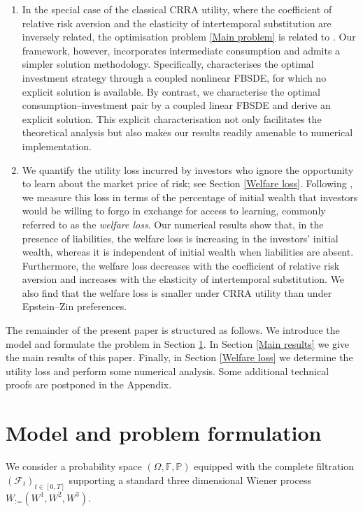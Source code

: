 \documentclass[12,reqno]{amsart}
\numberwithin{equation}{section}
\begin{document}
\begin{enumerate}
	\item In the special case of the classical CRRA utility, where the coefficient of relative risk aversion and the elasticity of intertemporal substitution are inversely related, the optimisation problem \eqref{Main problem} is related to \cite{horst2014forward}. Our framework, however, incorporates intermediate consumption and admits a simpler solution methodology. Specifically, \cite{horst2014forward} characterises the optimal investment strategy through a coupled nonlinear FBSDE, for which no explicit solution is available. By contrast, we characterise the optimal consumption--investment pair by a coupled linear FBSDE and derive an explicit solution. This explicit characterisation not only facilitates the theoretical analysis but also makes our results readily amenable to numerical implementation.
	\item We quantify the utility loss incurred by investors who ignore the opportunity to learn about the market price of risk; see Section \ref{Welfare loss}. Following \cite{escobar2016portfolio}, we measure this loss in terms of the percentage of initial wealth that investors would be willing to forgo in exchange for access to learning, commonly referred to as the \emph{welfare loss}. Our numerical results show that, in the presence of liabilities, the welfare loss is increasing in the investors' initial wealth, whereas it is independent of initial wealth when liabilities are absent. Furthermore, the welfare loss decreases with the coefficient of relative risk aversion and increases with the elasticity of intertemporal substitution. We also find that the welfare loss is smaller under CRRA utility than under Epstein--Zin preferences.
\end{enumerate}

The remainder of the present paper is structured as follows. We introduce the model and formulate the problem in Section \ref{Setting}. In Section \ref{Main results} we give the main results of this paper. Finally, in Section \ref{Welfare loss} we determine the utility loss and perform some numerical analysis. Some additional technical proofs are postponed in the Appendix.

\section{Model and problem formulation}\label{Setting}
We consider a probability space $(\Omega,\mathbb{F},\mathbb{P})$ equipped with the complete filtration $(\mathcal{F}_{t})_{t\in[0,T]}$ supporting a standard three dimensional Wiener process $W_:=(W^{1},W^{2},W^{3})$.
\end{document}
